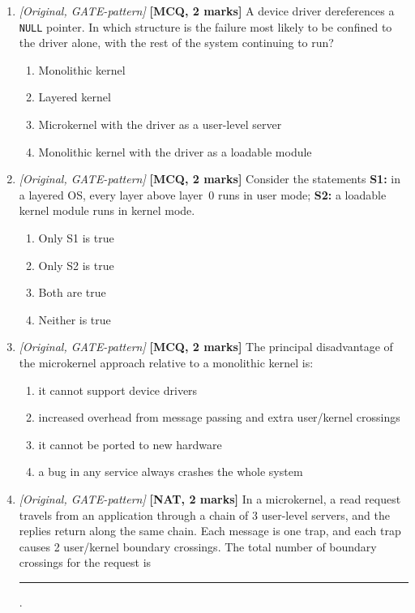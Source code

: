 \documentclass[11pt]{article}
\begin{document}
\begin{enumerate}
\item[\textbf{Q4}] \textit{[Original, GATE-pattern]} \textbf{[MCQ, 2 marks]} A device driver dereferences a \texttt{NULL} pointer. In which structure is the failure most likely to be confined to the driver alone, with the rest of the system continuing to run?
\begin{enumerate}
  \item[(A)] Monolithic kernel
  \item[(B)] Layered kernel
  \item[(C)] Microkernel with the driver as a user-level server
  \item[(D)] Monolithic kernel with the driver as a loadable module
\end{enumerate}

\item[\textbf{Q5}] \textit{[Original, GATE-pattern]} \textbf{[MCQ, 2 marks]} Consider the statements
\textbf{S1:} in a layered OS, every layer above layer~0 runs in user mode;
\textbf{S2:} a loadable kernel module runs in kernel mode.
\begin{enumerate}
  \item[(A)] Only S1 is true
  \item[(B)] Only S2 is true
  \item[(C)] Both are true
  \item[(D)] Neither is true
\end{enumerate}

\item[\textbf{Q6}] \textit{[Original, GATE-pattern]} \textbf{[MCQ, 2 marks]} The principal disadvantage of the microkernel approach relative to a monolithic kernel is:
\begin{enumerate}
  \item[(A)] it cannot support device drivers
  \item[(B)] increased overhead from message passing and extra user/kernel crossings
  \item[(C)] it cannot be ported to new hardware
  \item[(D)] a bug in any service always crashes the whole system
\end{enumerate}

\item[\textbf{Q7}] \textit{[Original, GATE-pattern]} \textbf{[NAT, 2 marks]} In a microkernel, a read request travels from an application through a chain of 3 user-level servers, and the replies return along the same chain. Each message is one trap, and each trap causes 2 user/kernel boundary crossings. The total number of boundary crossings for the request is \rule{1.5cm}{0.4pt}.


\end{enumerate}
\end{document}
